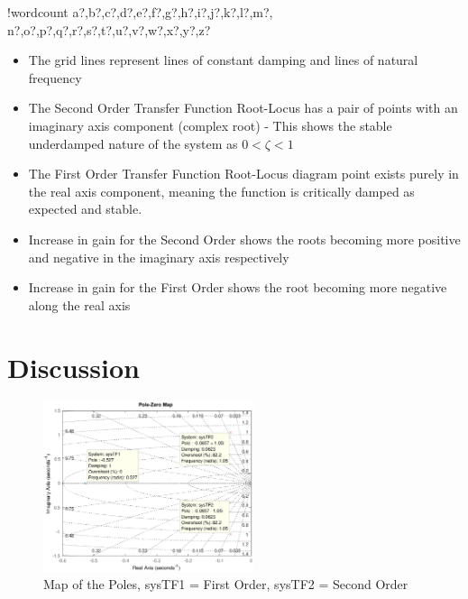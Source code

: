 \documentclass[11pt]{article}
\providecommand{\tightlist}{%
  \setlength{\itemsep}{0pt}\setlength{\parskip}{0pt}}
\newcounter{words}
\newenvironment{counted}{%
  \setcounter{words}{0}
  \SearchList!{wordcount}{\stepcounter{words}}
    {a?,b?,c?,d?,e?,f?,g?,h?,i?,j?,k?,l?,m?,
    n?,o?,p?,q?,r?,s?,t?,u?,v?,w?,x?,y?,z?}
  \UndoBoundary{'}
  \SearchOrder{p;}}{%
  \StopSearching}
\begin{document}
\begin{counted}
\begin{itemize}
\tightlist
\item
  The grid lines represent lines of constant damping and lines of
  natural frequency
\item
  The Second Order Transfer Function Root-Locus has a pair of points
  with an imaginary axis component (complex root) - This shows the
  stable underdamped nature of the system as \(0<\zeta<1\)
\item
  The First Order Transfer Function Root-Locus diagram point exists
  purely in the real axis component, meaning the function is critically
  damped as expected and stable.
\item
  Increase in gain for the Second Order shows the roots becoming more
  positive and negative in the imaginary axis respectively
\item
  Increase in gain for the First Order shows the root becoming more
  negative along the real axis
\end{itemize}

\section{Discussion}\label{discussion}

\begin{figure}
  \begin{center}
  \vspace{-40pt}
  \includegraphics[trim = 35 14 35 0, clip, width=0.55\textwidth]{poleszmap.eps}
  \end{center}
  \caption{Map of the Poles, sysTF1 = First Order, sysTF2 = Second Order}
 \label{poleszmap}
  \vspace{-20pt}
\end{figure}


\end{counted}
\end{document}
